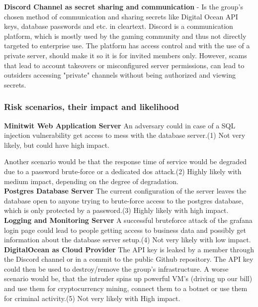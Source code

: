 \textbf{Discord Channel as secret sharing and communication} - Is the group's chosen method of communication and sharing secrets like Digital Ocean API keys, database passwords and etc. in cleartext. Discord is a communication platform, which is mostly used by the gaming community and thus not directly targeted to enterprise use. The platform has access control and with the use of a private server, should make it so it is for invited members only. However, scams\cite{discord_privacy} that lead to account takeovers or misconfigured server permissions, can lead to outsiders accessing "private" channels without being authorized and viewing secrets.\\


\subsubsection{Risk scenarios, their impact and likelihood}

\textbf{Minitwit Web Application Server}
An adversary could in case of a SQL injection vulnerability get access to mess with the database server.(1) Not very likely, but could have high impact.

Another scenario would be that the response time of service would be degraded due to a password brute-force or a dedicated \gls{dos} attack.(2) Highly likely with medium impact, depending on the degree of degradation. \\


\textbf{Postgres Database Server}
The current configuration of the server leaves the database open to anyone trying to brute-force access to the postgres database, which is only protected by a password.(3) Highly likely with high impact.\\


\textbf{Logging and Monitoring Server}
A successful bruteforce attack of the grafana login page could lead to people getting access to business data and possibly get information about the database server setup.(4) Not very likely with low impact.\\


\textbf{DigitalOcean as Cloud Provider}
The API key is leaked by a member through the Discord channel or in a commit to the public Github repository. The API key could then be used to destroy/remove the group's infrastructure. A worse scenario would be, that the intruder spins up powerful VM's (driving up our bill) and use them for cryptocurrency mining, connect them to a botnet or use them for criminal activity.(5) Not very likely with High impact.

